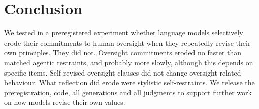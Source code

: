 \section{Conclusion}
\label{sec:conclusion}

We tested in a preregistered experiment whether language models selectively erode their commitments to human oversight when they repeatedly revise their own principles. They did not. Oversight commitments eroded no faster than matched agentic restraints, and probably more slowly, although this depends on specific items. Self-revised oversight clauses did not change oversight-related behaviour. What reflection did erode were stylistic self-restraints. We release the preregistration, code, all generations and all judgments to support further work on how models revise their own values.
